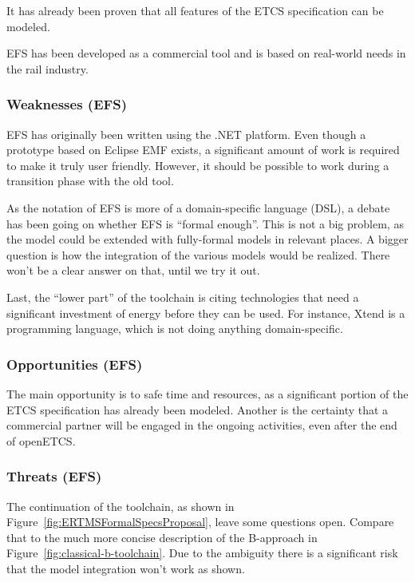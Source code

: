 It has already been proven that all features of the ETCS specification can be modeled.

EFS has been developed as a commercial tool and is based on real-world needs in the rail industry.

\subsubsection{Weaknesses (EFS)}

EFS has originally been written using the .NET platform.  Even though a prototype based on Eclipse EMF exists, a significant amount of work is required to make it truly user friendly.  However, it should be possible to work during a transition phase with the old tool.

As the notation of EFS is more of a domain-specific language (DSL), a debate has been going on whether EFS is ``formal enough''.  This is not a big problem, as the model could be extended with fully-formal models in relevant places.  A bigger question is how the integration of the various models would be realized.  There won't be a clear answer on that, until we try it out.

Last, the ``lower part'' of the toolchain is citing technologies that need a significant investment of energy before they can be used.  For instance, Xtend is a programming language, which is not doing anything domain-specific.

\subsubsection{Opportunities (EFS)}

The main opportunity is to safe time and resources, as a significant portion of the ETCS specification has already been modeled.  Another is the certainty that a commercial partner will be engaged in the ongoing activities, even after the end of openETCS.

\subsubsection{Threats (EFS)}

The continuation of the toolchain, as shown in Figure~\ref{fig:ERTMSFormalSpecsProposal}, leave some questions open.  Compare that to the much more concise description of the B-approach in Figure~\ref{fig:classical-b-toolchain}.  Due to the ambiguity there is a significant risk that the model integration won't work as shown.

